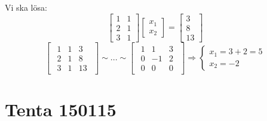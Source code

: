 \begin{Ex}
\[    \]
    Vi ska lösa:
    \[
        \begin{bmatrix}
            1 & 1\\
            2 & 1\\
            3 & 1
        \end{bmatrix}
        \begin{bmatrix} x_1 \\ x_2 \end{bmatrix} = \begin{bmatrix} 3 \\8\\13 \end{bmatrix}
    \]
    \[
        \begin{bmatrix}
        \begin{array}{cc|c}
            1 & 1 & 3\\
            2 & 1 & 8\\
            3 & 1 & 13
        \end{array}
        \end{bmatrix}
        \sim ... \sim
        \begin{bmatrix}
        \begin{array}{cc|c}
            1 & 1 & 3\\
            0 & -1 & 2\\
            0 & 0 & 0
        \end{array}
        \end{bmatrix}
        \Rightarrow
        \begin{cases}
            x_1 = 3 + 2 = 5\\
            x_2 = -2
        \end{cases}
    \]
\end{Ex}


\section{Tenta 150115} %
\label{sec:tenta_150115}


